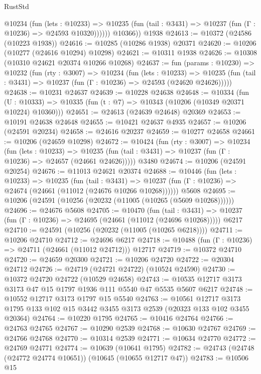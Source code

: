 \begin{lexlean}{RustStd}
\begin{coremodule}
            @10234
              (fun (lets : @10233) =>
              @10235 (fun (tail : @3431) => @10237 (fun (Γ : @10236) => @24593 @10320))))))
        @10366))
    @1938
@24613 := @10372 (@24586 (@10223 @1938))
@24616 := @10285 (@10286 @1938) @20371
@24620 := @10206 (@10277 (@24616 @10294) @10298)
@24621 := @10311 @1938
@24626 := @10308 (@10310 @24621 @20374 @10266 @10268)
@24637 := fun (params : @10230) =>
  @10232
    (fun (rty : @3007) =>
    @10234
      (fun (lets : @10233) =>
      @10235 (fun (tail : @3431) => @10237 (fun (Γ : @10236) => @24593 (@24620 @24626)))))
@24638 := @10231 @24637
@24639 := @10228 @24638
@24648 := @10334
    (fun (U : @10333) => @10335 (fun (t : @7) => @10343 (@10206 (@10349 @20371 @10224) @10360)))
@24651 := @24613 (@24639 @24648) @20369
@24653 := @10191 @24638 @24648
@24655 := @10421 @24637 @4935
@24657 := @10206 (@24591 @20234)
@24658 := @24616 @20237
@24659 := @10277 @24658
@24661 := @10206 (@24659 @10298)
@24672 := @10424
    (fun (rty : @3007) =>
    @10234
      (fun (lets : @10233) =>
      @10235 (fun (tail : @3431) => @10237 (fun (Γ : @10236) => @24657 (@24661 @24626)))))
    @3480
@24674 := @10206 (@24591 @20254)
@24676 := @11013 @24621 @20374
@24688 := @10446
    (fun (lets : @10233) =>
    @10235
      (fun (tail : @3431) =>
      @10237 (fun (Γ : @10236) => @24674 (@24661 (@11012 (@24676 @10266 @10268))))))
    @5608
@24695 := @10206 (@24591 (@10256 (@20232 (@11005 (@10265 (@5609 @10268))))))
@24696 := @24676 @5608
@24705 := @10470
    (fun (tail : @3431) => @10237 (fun (Γ : @10236) => @24695 (@24661 (@11012 (@24696 @10268)))))
    @6217
@24710 := @24591 (@10256 (@20232 (@11005 (@10265 @6218))))
@24711 := @10206 @24710
@24712 := @24696 @6217
@24718 := @10488 (fun (Γ : @10236) => @24711 (@24661 (@11012 @24712))) @12717
@24719 := @10372 @24710
@24720 := @24659 @20300
@24721 := @10206 @24720
@24722 := @20304 @24712
@24726 := @24719 (@24721 @24722) (@10524 @24590)
@24730 := @10372 @24720 @24722 (@10529 @24658)
@24743 := @10535 @12717 @3173 @3173 @47 @15 @1797 @1936 @111 @5540 @47 @5535 @5607 @6217
@24748 := @10552 @12717 @3173 @1797 @15 @5540
@24763 := @10561
    @12717
    @3173
    @1795
    @133
    @102
    @15
    @3442
    @3455
    @3173
    @2539
    (@20323 @133 @102 @3455 @20364)
@24764 := @10220 @1795
@24765 := @10416 @24764
@24766 := @24763 @24765
@24767 := @10290 @2539
@24768 := @10630 @24767
@24769 := @24766 @24768
@24770 := @10314 @2539
@24771 := @10634 @24770
@24772 := @24769 @24771
@24774 := @10639 (@10641 @1795)
@24782 := @24743 (@24748 (@24772 @24774 @10651)) (@10645 (@10655 @12717 @47))
@24783 := @10506 @15

\end{coremodule}
\end{lexlean}
